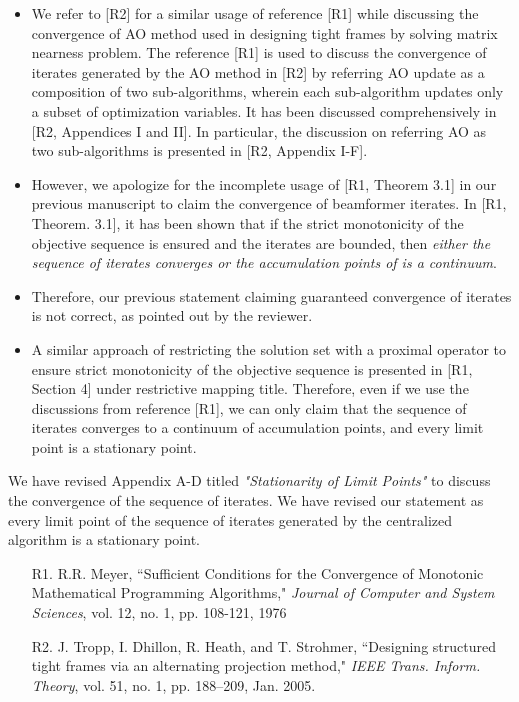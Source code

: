\begin{enumerate}
\begin{itemize}
	\item We refer to [R2] for a similar usage of reference [R1] while discussing the convergence of \ac{AO} method used in designing tight frames by solving matrix nearness problem. The reference [R1] is used to discuss the convergence of iterates generated by the \ac{AO} method in [R2] by referring \ac{AO} update as a composition of two sub-algorithms, wherein each sub-algorithm updates only a subset of optimization variables. It has been discussed comprehensively in [R2, Appendices I and II]. In particular, the discussion on referring \ac{AO} as two sub-algorithms is presented in [R2, Appendix I-F].
	\item However, we apologize for the incomplete usage of [R1, Theorem 3.1] in our previous manuscript to claim the convergence of beamformer iterates. In [R1, Theorem. 3.1], it has been shown that if the strict monotonicity of the objective sequence is ensured and the iterates are bounded, then \textit{either the sequence of iterates converges or the accumulation points of  is a continuum}.
	\item Therefore, our previous statement claiming guaranteed convergence of iterates is not correct, as pointed out by the reviewer. 
	\item A similar approach of restricting the solution set with a proximal operator to ensure strict monotonicity of the objective sequence is presented in [R1, Section 4] under restrictive mapping title. Therefore, even if we use the discussions from reference [R1], we can only claim that the sequence of iterates  converges to a continuum of accumulation points, and every limit point is a stationary point.
\end{itemize}

We have revised Appendix A-D titled \textit{"Stationarity of Limit Points"} to discuss the convergence of the sequence of iterates. We have revised our statement as every limit point of the sequence of iterates generated by the centralized algorithm is a stationary point.

\vspace{1eM}
\begin{itemize}		
	\item[R1.] R.R. Meyer, ``Sufficient Conditions for the Convergence of Monotonic Mathematical Programming Algorithms," \emph{Journal of Computer and System Sciences}, vol. 12, no. 1, pp. 108-121, 1976
	\item[R2.] J. Tropp, I. Dhillon, R. Heath, and T. Strohmer, ``Designing structured tight frames via an alternating projection method," \emph{IEEE Trans. Inform. Theory}, vol. 51, no. 1, pp. 188–209, Jan. 2005.
\end{itemize}

\end{enumerate}